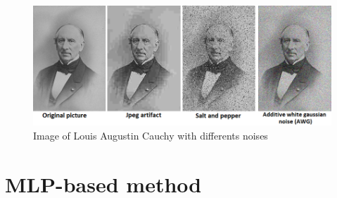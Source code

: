 \documentclass[8pt]{beamer}
\begin{document}
\begin{frame}
    \begin{figure}[H]
        \begin{center}
            \includegraphics[scale=0.45]{../datasets/images/Allnoise.png}
            \caption{Image of Louis Augustin Cauchy with differents noises}
        \end{center}
    \end{figure}
    
\end{frame}


\section{MLP-based method}
\end{document}
